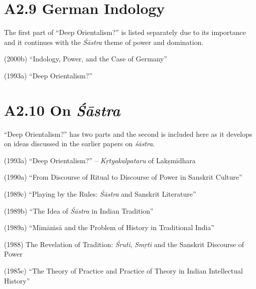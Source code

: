 \vspace{-.4cm}

\section*{A2.9 German Indology}

The first part of “Deep Orientalism?” is listed separately due to its importance and it continues with the \textit{Śāstra} theme of power and domination.

(2000b) “Indology, Power, and the Case of Germany”

(1993a) “Deep Orientalism?”

\newpage

\vspace{-.3cm}

\section*{A2.10 On {\it {\bfseries Śāstra}}}

\vspace{-.2cm}

“Deep Orientalism?” has two parts and the second is included here as it develops on ideas discussed in the earlier papers on \textit{śāstra}.

(1993a) “Deep Orientalism?” – \textit{Kṛtyakalpataru} of Lakṣmīdhara

(1990a) “From Discourse of Ritual to Discourse of Power in Sanskrit Culture”

(1989c) “Playing by the Rules: \textit{Śāstra} and Sanskrit Literature”

(1989b) “The Idea of \textit{Śāstra} in Indian Tradition”

(1989a) “Mīmāṁsā and the Problem of History in Traditional India”

(1988) The Revelation of Tradition: \textit{Śruti}, \textit{Smṛti} and the Sanskrit Discourse of Power 


(1985c) “The Theory of Practice and Practice of Theory in Indian Intellectual History”

